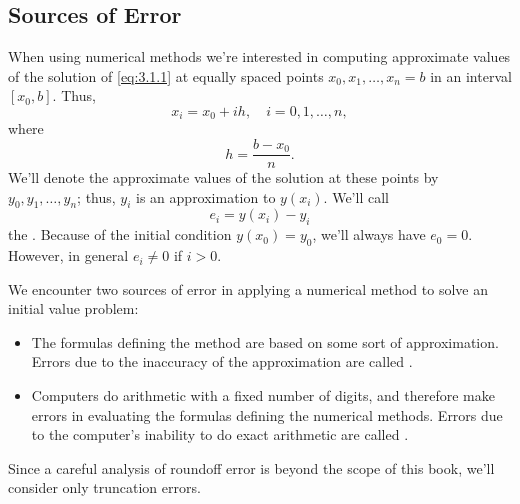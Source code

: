 \documentclass{ximera}
\begin{document}
 
 
\subsection*{Sources of Error}
 
When using numerical methods we're interested in
computing approximate values of the solution of \eqref{eq:3.1.1} at
equally spaced points $x_0, x_1, \ldots, x_n=b$ in an interval
$[x_0,b]$.
 Thus,
$$
x_i=x_0+ih,\quad i=0,1, \dots,n,
$$
where
$$
h=\frac{b-x_0}{n}.
$$
We'll denote the approximate values of the solution at these points
by $y_0, y_1, \ldots, y_n$;   thus, $y_i$ is an approximation to
$y(x_i)$.
We'll call
$$
e_i=y(x_i)-y_i
$$
the . Because of the initial
condition
$y(x_0)=y_0$, we'll always have $e_0=0$. However, in general
$e_i\neq 0$ if $i>0$.
 
We encounter two sources of error
in applying a numerical method to solve an initial value problem:
\begin{itemize}
\item
The formulas defining the method are based on some sort of
approximation. Errors due to the inaccuracy of the approximation are
called .
\item
Computers do arithmetic with a fixed number of digits, and therefore
make errors in evaluating the formulas defining the numerical methods.
Errors due to the computer's inability to do exact arithmetic are
called .
\end{itemize}
 
Since a careful analysis of roundoff error is beyond the scope of this
book, we'll consider only truncation errors.
 
\end{document}
